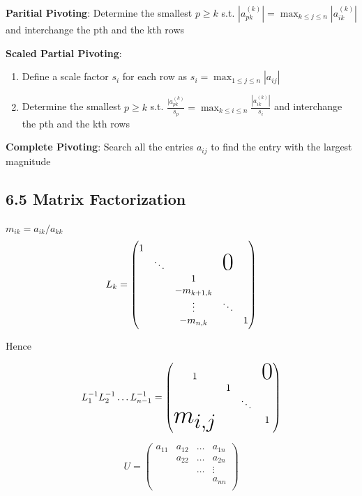 \documentclass[11pt]{article}
\begin{document}
\textbf{Paritial Pivoting}: Determine the smallest \(p\ge k\) s.t.
\(|a_{pk}^{(k)}|=\displaystyle\max_{k\le j\le n}|a_{ik}^{(k)}|\) and
interchange the pth and the kth rows

\textbf{Scaled Partial Pivoting}:
\begin{enumerate}
\item Define a scale factor \(s_i\) for each row as \(s_i=\displaystyle\max_{1\le
      j\le n}|a_{ij}|\)
\item Determine the smallest \(p\ge k\) s.t.
\(\frac{|a_{pk}^{(k)}}{s_p}=\displaystyle\max_{k\le i\le
      n}\frac{|a_{ik}^{(k)}|}{s_i}\)
and interchange the pth and the kth rows
\end{enumerate}


\textbf{Complete Pivoting}: Search all the entries \(a_{ij}\) to find the entry with
the largest magnitude
\subsection{6.5 Matrix Factorization}
\label{sec:org982232e}
\(m_{ik}=a_{ik}/a_{kk}\)
\begin{equation*}
L_k=
\begin{pmatrix}
1 &            &            &               &  \\
  & \ddots     &            &\mbox{\Huge 0} &  \\
  &            & 1          &               &  \\
  &            & -m_{k+1,k} &               &  \\
  &            & \vdots     & \ddots        &  \\
  &            & -m_{n,k}   &               & 1\\
\end{pmatrix}
\end{equation*}  


Hence 

\begin{equation*}
L_1^{-1}L_2^{-1}\dots L_{n-1}^{-1}=
\begin{pmatrix}
1&&&\mbox{\Huge 0}\\
&1&&\\
&&\ddots&\\
\text{\Huge $m_{i,j}$}&&&1\\
\end{pmatrix}
\end{equation*}

\begin{equation*}
U=
\begin{pmatrix}
a_{11}&a_{12}&\dots&a_{1n}\\
&a_{22}&\dots&a_{2n}\\
&&\dots&\vdots\\
&&&a_{nn}\\
\end{pmatrix}
\end{equation*}
\end{document}
